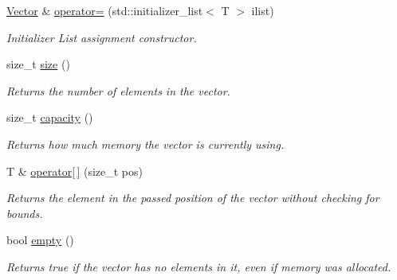 \begin{DoxyCompactItemize}
\hyperlink{classsc_1_1Vector}{Vector} \& \hyperlink{classsc_1_1Vector_a4c1f64a652e6febd6e06e2bf24f83f8d}{operator=} (std\+::initializer\+\_\+list$<$ T $>$ ilist)
\begin{DoxyCompactList}\small\item\em Initializer List assignment constructor. \end{DoxyCompactList}\item 
\mbox{\label{classsc_1_1Vector_a2ccab0421fad94601e6bd5e344aa3340}} 
size\+\_\+t \hyperlink{classsc_1_1Vector_a2ccab0421fad94601e6bd5e344aa3340}{size} ()
\begin{DoxyCompactList}\small\item\em Returns the number of elements in the vector. \end{DoxyCompactList}\item 
\mbox{\label{classsc_1_1Vector_a1786a092f4737cbfa29a748efa96476a}} 
size\+\_\+t \hyperlink{classsc_1_1Vector_a1786a092f4737cbfa29a748efa96476a}{capacity} ()
\begin{DoxyCompactList}\small\item\em Returns how much memory the vector is currently using. \end{DoxyCompactList}\item 
\mbox{\label{classsc_1_1Vector_a90eca701f66fa5d49ecf0bf4232c1279}} 
T \& \hyperlink{classsc_1_1Vector_a90eca701f66fa5d49ecf0bf4232c1279}{operator\mbox{[}$\,$\mbox{]}} (size\+\_\+t pos)
\begin{DoxyCompactList}\small\item\em Returns the element in the passed position of the vector without checking for bounds. \end{DoxyCompactList}\item 
\mbox{\label{classsc_1_1Vector_ad32041924880336598c1a867d4cb9c81}} 
bool \hyperlink{classsc_1_1Vector_ad32041924880336598c1a867d4cb9c81}{empty} ()
\begin{DoxyCompactList}\small\item\em Returns true if the vector has no elements in it, even if memory was allocated. \end{DoxyCompactList}\item 
\mbox{\label{classsc_1_1Vector_a13736daa34984783b36b8abc0dfb8a5f}} 

\end{DoxyCompactItemize}
